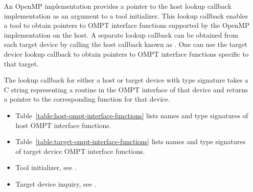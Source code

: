 \descr

An OpenMP implementation provides a pointer to the host lookup callback 
implementation as an argument to a tool initializer. This lookup callback
enables a tool to obtain pointers to OMPT interface functions supported by the 
OpenMP implementation on the host. 
A separate lookup callback can be obtained from each target device 
by calling the host callback known as . One can use the
target device lookup callback to 
obtain pointers to OMPT interface functions specific to that target.

\constraints
The lookup callback for either a host or target device with type
signature  takes a C string
representing a routine in the OMPT interface of that device and
returns a pointer to the corresponding function for that device.

\crossreferences
\begin{itemize}
\item Table~\ref{table:host-ompt-interface-functions} 
lists names and type signatures of
host OMPT interface functions. 
\item Table~\ref{table:target-ompt-interface-functions} lists 
names and type signatures of target device OMPT interface functions.
\item Tool initializer, see .
\item Target device inquiry, see .
\end{itemize}


